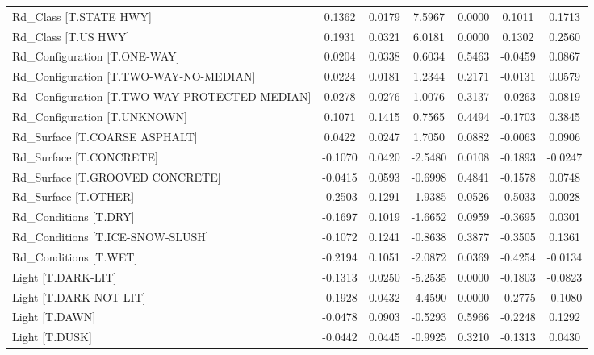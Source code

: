 \begin{longtable}{p{4cm}cccccc}
Rd\_Class [T.STATE HWY]                        &  0.1362 &    0.0179 &  7.5967 &       0.0000 &  0.1011 &  0.1713 \\
Rd\_Class [T.US HWY]                           &  0.1931 &    0.0321 &  6.0181 &       0.0000 &  0.1302 &  0.2560 \\
Rd\_Configuration [T.ONE-WAY]                  &  0.0204 &    0.0338 &  0.6034 &       0.5463 & -0.0459 &  0.0867 \\
Rd\_Configuration [T.TWO-WAY-NO-MEDIAN]        &  0.0224 &    0.0181 &  1.2344 &       0.2171 & -0.0131 &  0.0579 \\
Rd\_Configuration [T.TWO-WAY-PROTECTED-MEDIAN] &  0.0278 &    0.0276 &  1.0076 &       0.3137 & -0.0263 &  0.0819 \\
Rd\_Configuration [T.UNKNOWN]                  &  0.1071 &    0.1415 &  0.7565 &       0.4494 & -0.1703 &  0.3845 \\
Rd\_Surface [T.COARSE ASPHALT]                 &  0.0422 &    0.0247 &  1.7050 &       0.0882 & -0.0063 &  0.0906 \\
Rd\_Surface [T.CONCRETE]                       & -0.1070 &    0.0420 & -2.5480 &       0.0108 & -0.1893 & -0.0247 \\
Rd\_Surface [T.GROOVED CONCRETE]               & -0.0415 &    0.0593 & -0.6998 &       0.4841 & -0.1578 &  0.0748 \\
Rd\_Surface [T.OTHER]                          & -0.2503 &    0.1291 & -1.9385 &       0.0526 & -0.5033 &  0.0028 \\
Rd\_Conditions [T.DRY]                         & -0.1697 &    0.1019 & -1.6652 &       0.0959 & -0.3695 &  0.0301 \\
Rd\_Conditions [T.ICE-SNOW-SLUSH]              & -0.1072 &    0.1241 & -0.8638 &       0.3877 & -0.3505 &  0.1361 \\
Rd\_Conditions [T.WET]                         & -0.2194 &    0.1051 & -2.0872 &       0.0369 & -0.4254 & -0.0134 \\
Light [T.DARK-LIT]                            & -0.1313 &    0.0250 & -5.2535 &       0.0000 & -0.1803 & -0.0823 \\
Light [T.DARK-NOT-LIT]                        & -0.1928 &    0.0432 & -4.4590 &       0.0000 & -0.2775 & -0.1080 \\
Light [T.DAWN]                                & -0.0478 &    0.0903 & -0.5293 &       0.5966 & -0.2248 &  0.1292 \\
Light [T.DUSK]                                & -0.0442 &    0.0445 & -0.9925 &       0.3210 & -0.1313 &  0.0430 \\

\end{longtable}
